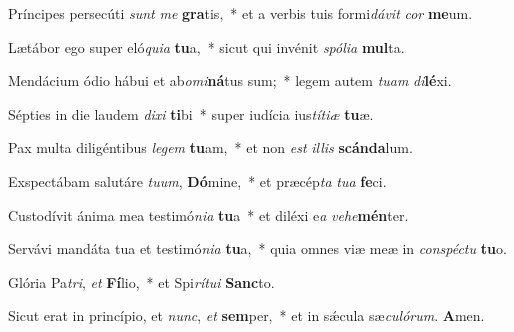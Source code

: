 \item Príncipes persecúti \textit{sunt} \textit{me} \textbf{gra}tis,~* et a verbis tuis formi\textit{dá}\textit{vit} \textit{cor} \textbf{me}um.

\item Lætábor ego super eló\textit{qui}\textit{a} \textbf{tu}a,~* sicut qui invénit \textit{spó}\textit{li}\textit{a} \textbf{mul}ta.

\item Mendácium ódio hábui et ab\textit{o}\textit{mi}\textbf{ná}tus sum;~* legem autem \textit{tu}\textit{am} \textit{di}\textbf{lé}xi.

\item Sépties in die laudem \textit{di}\textit{xi} \textbf{ti}bi~* super iudícia ius\textit{tí}\textit{ti}\textit{æ} \textbf{tu}æ.

\item Pax multa diligéntibus \textit{le}\textit{gem} \textbf{tu}am,~* et non \textit{est} \textit{il}\textit{lis} \textbf{scán}\textbf{da}lum.

\item Exspectábam salutáre \textit{tu}\textit{um}, \textbf{Dó}mine,~* et præcép\textit{ta} \textit{tu}\textit{a} \textbf{fe}ci.

\item Custodívit ánima mea testimó\textit{ni}\textit{a} \textbf{tu}a~* et diléxi e\textit{a} \textit{ve}\textit{he}\textbf{mén}ter.

\item Servávi mandáta tua et testimó\textit{ni}\textit{a} \textbf{tu}a,~* quia omnes viæ meæ in \textit{con}\textit{spéc}\textit{tu} \textbf{tu}o.

\item Glória Pa\textit{tri}, \textit{et} \textbf{Fí}lio,~* et Spi\textit{rí}\textit{tu}\textit{i} \textbf{Sanc}to.

\item Sicut erat in princípio, et \textit{nunc}, \textit{et} \textbf{sem}per,~* et in sǽcula sæ\textit{cu}\textit{ló}\textit{rum}. \textbf{A}men.
